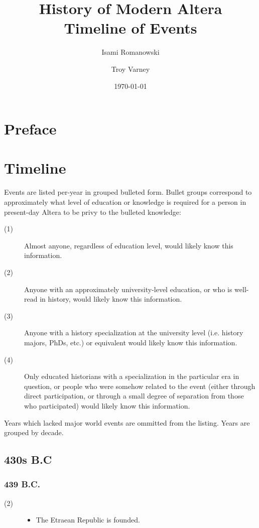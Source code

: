 \documentclass[a4paper, 11pt]{article}
\def\level#1{\item[(#1)\hspace{9.5pt}]}
\newenvironment{knowlevels}{\begin{description}}{\end{description}} %
\def\decadeblk#1{\subsection{#1}}
\def\yearblk#1{\subsubsection{#1}}
\begin{document}
\title{History of Modern Altera \\ \large{Timeline of Events}}
\date{\today}
\author{Isami Romanowski \and Troy Varney}
\maketitle

\tableofcontents

\section{Preface}

\section{Timeline}
Events are listed per-year in grouped bulleted form.  Bullet groups correspond to approximately what level of education or knowledge is required for a person in present-day Altera to be privy to the bulleted knowledge:
\begin{knowlevels}
\level{1}  Almost anyone, regardless of education level, would likely know this information.

\level{2}  Anyone with an approximately university-level education, or who is well-read in history, would likely know this information.

\level{3}  Anyone with a history specialization at the university level (i.e. history majors, PhDs, etc.) or equivalent would likely know this information.

\level{4}  Only educated historians with a specialization in the particular era in question, or people who were somehow related to the event (either through direct participation, or through a small degree of separation from those who participated) would likely know this information.
\end{knowlevels}
Years which lacked major world events are ommitted from the listing.  Years are grouped by decade.

\decadeblk{430s B.C}
\yearblk{439 B.C.}
\begin{knowlevels}
\level{2} {
  \begin{itemize}
  \item The Etraean Republic is founded.
  \end{itemize}
}
\end{knowlevels}
\end{document}
